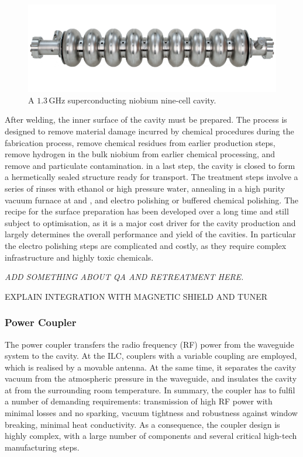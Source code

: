 \begin{figure}[htbp]
   \includegraphics[width=\hsize]{chapters/figures/tesla9cell-cavity-2}
\caption{A $1.3\,{\mathrm{GHz}}$ superconducting niobium nine-cell cavity.
}
\label{fig:tesla-cavity}
\end{figure}

After welding, the inner surface of the cavity must be prepared.
The process is designed to remove material damage incurred by chemical procedures during the fabrication process, remove chemical residues from earlier production steps, remove hydrogen in the bulk niobium from earlier chemical processing, and remove and particulate contamination.
in a last step, the cavity is closed to form a hermetically sealed structure ready for transport.
The treatment steps involve a series of rinses with ethanol or high pressure water, annealing in a high purity vacuum furnace at  and , and electro polishing or buffered chemical polishing.
The recipe for the surface preparation has been developed over a long time and still subject to optimisation, as it is a major cost driver for the cavity production and largely determines the overall performance and yield of the cavities.
In particular the electro polishing steps are complicated and costly, as they require complex infrastructure and highly toxic chemicals.

{\it 
ADD SOMETHING ABOUT QA AND RETREATMENT HERE.

EXPLAIN INTEGRATION WITH MAGNETIC SHIELD AND TUNER}
 


\subsubsection{Power Coupler}

The power coupler transfers the radio frequency (RF) power from the waveguide system to the cavity. 
At the ILC, couplers with a variable coupling are employed, which is realised by a movable antenna.
At the same time, it separates the cavity vacuum from the atmospheric pressure in the waveguide, and insulates the cavity at  from the surrounding room temperature.
In summary, the coupler has to fulfil a number of demanding requirements: transmission of high RF power with minimal losses and no sparking, vacuum tightness and robustness against window breaking, minimal heat conductivity.  
As a consequence, the coupler design is highly complex, with a large number of components and several critical high-tech manufacturing steps.

